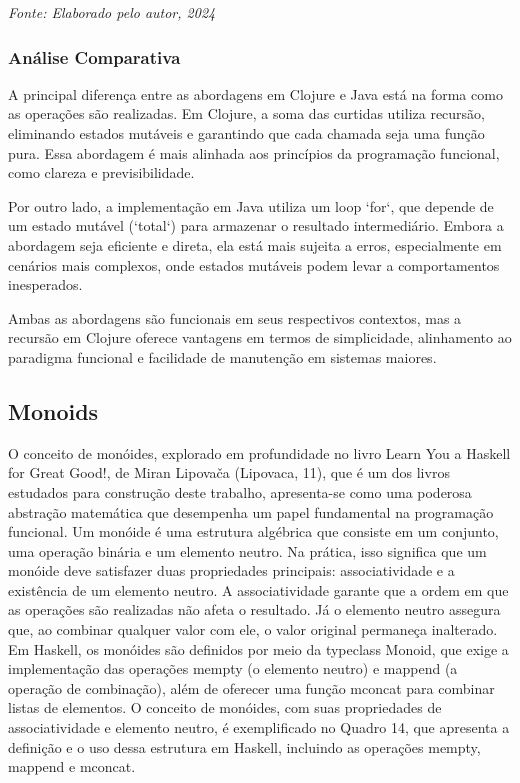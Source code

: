 \begin{center}
    \textit{Fonte: Elaborado pelo autor, 2024} 
\end{center}

\subsubsection*{Análise Comparativa}

A principal diferença entre as abordagens em Clojure e Java está na forma como as operações são realizadas. Em Clojure, a soma das curtidas utiliza recursão, eliminando estados mutáveis e garantindo que cada chamada seja uma função pura. Essa abordagem é mais alinhada aos princípios da programação funcional, como clareza e previsibilidade.

Por outro lado, a implementação em Java utiliza um loop `for`, que depende de um estado mutável (`total`) para armazenar o resultado intermediário. Embora a abordagem seja eficiente e direta, ela está mais sujeita a erros, especialmente em cenários mais complexos, onde estados mutáveis podem levar a comportamentos inesperados.

Ambas as abordagens são funcionais em seus respectivos contextos, mas a recursão em Clojure oferece vantagens em termos de simplicidade, alinhamento ao paradigma funcional e facilidade de manutenção em sistemas maiores.

\subsection{Monoids}

O conceito de monóides, explorado em profundidade no livro Learn You a Haskell for Great Good!, de Miran Lipovača (Lipovaca, 11), que é um dos livros estudados para construção deste trabalho, apresenta-se como uma poderosa abstração matemática que desempenha um papel fundamental na programação funcional. Um monóide é uma estrutura algébrica que consiste em um conjunto, uma operação binária e um elemento neutro. Na prática, isso significa que um monóide deve satisfazer duas propriedades principais: associatividade e a existência de um elemento neutro.
A associatividade garante que a ordem em que as operações são realizadas não afeta o resultado. Já o elemento neutro assegura que, ao combinar qualquer valor com ele, o valor original permaneça inalterado. Em Haskell, os monóides são definidos por meio da typeclass Monoid, que exige a implementação das operações mempty (o elemento neutro) e mappend (a operação de combinação), além de oferecer uma função mconcat para combinar listas de elementos. O conceito de monóides, com suas propriedades de associatividade e elemento neutro, é exemplificado no Quadro 14, que apresenta a definição e o uso dessa estrutura em Haskell, incluindo as operações mempty, mappend e mconcat.


